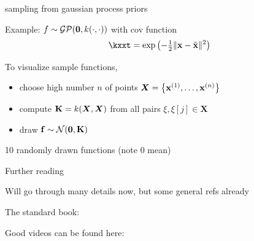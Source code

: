 \documentclass[11pt,compress,t,notes=noshow, xcolor=table]{beamer}
\begin{document}
\begin{framei}[sep=L]{sampling from gaussian process priors}
\item Example: $f \sim \mathcal{GP}(\mathbf{0}, k(\cdot, \cdot))$ with cov function
$$ \kxxt = \exp\left(-\tfrac{1}{2}\xxtnorm^2\right)$$
\item To visualize sample functions, 
\begin{itemize}
\item choose high number $n$ of points $\bm{X} = \left\{ \mathbf{x}^{(1)}, \ldots, \mathbf{x}^{(n)}\right\}$
  \item compute $\mathbf{K} = k(\bm{X}, \bm{X})$ from all pairs $\xi, \xi[j] \in \bm{X}$ 
  \item draw $\mathbf{f} \sim \mathcal{N}(\mathbf{0}, \mathbf{K})$ 
\end{itemize}
\item 10 randomly drawn functions (note 0 mean)
\vfill
{}
\end{framei}

\begin{framei}[sep=L]{Further reading}

\item Will go through many details now, but some general refs already

\item The standard book: 

\item Good videos can be found here:



\end{framei}
\endlecture
\end{document}
